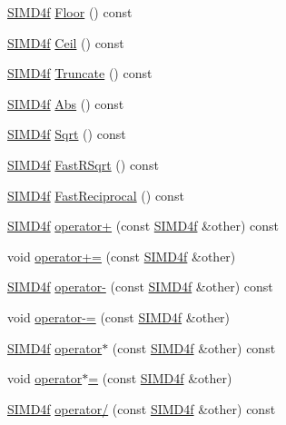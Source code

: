 \begin{DoxyCompactItemize}
\item 
\hyperlink{class_s_i_m_d4f}{S\+I\+M\+D4f} \hyperlink{class_s_i_m_d4f_a6687bf362a488251b8c5c495cfb2a385}{Floor} () const 
\item 
\hyperlink{class_s_i_m_d4f}{S\+I\+M\+D4f} \hyperlink{class_s_i_m_d4f_a8eec4c908f66003bb8bf1067a6c59bba}{Ceil} () const 
\item 
\hyperlink{class_s_i_m_d4f}{S\+I\+M\+D4f} \hyperlink{class_s_i_m_d4f_a80d9698aefb6ddcefde55b077ee22e2e}{Truncate} () const 
\item 
\hyperlink{class_s_i_m_d4f}{S\+I\+M\+D4f} \hyperlink{class_s_i_m_d4f_a57b0c4d2e3dee7a7463040c76f9d34bd}{Abs} () const 
\item 
\hyperlink{class_s_i_m_d4f}{S\+I\+M\+D4f} \hyperlink{class_s_i_m_d4f_a510350c7a4ed579fd9c143bd059e6e05}{Sqrt} () const 
\item 
\hyperlink{class_s_i_m_d4f}{S\+I\+M\+D4f} \hyperlink{class_s_i_m_d4f_a40f4dbbc2538ba8bd8d92c18e617ee59}{Fast\+R\+Sqrt} () const 
\item 
\hyperlink{class_s_i_m_d4f}{S\+I\+M\+D4f} \hyperlink{class_s_i_m_d4f_aee80a83cd05cbfe0062b4d6935d2d7b8}{Fast\+Reciprocal} () const 
\item 
\hyperlink{class_s_i_m_d4f}{S\+I\+M\+D4f} \hyperlink{class_s_i_m_d4f_a37059580a943f034510927272fa06c38}{operator+} (const \hyperlink{class_s_i_m_d4f}{S\+I\+M\+D4f} \&other) const 
\item 
void \hyperlink{class_s_i_m_d4f_ab547cee5fcc6f68c1e5e74c9e14cd564}{operator+=} (const \hyperlink{class_s_i_m_d4f}{S\+I\+M\+D4f} \&other)
\item 
\hyperlink{class_s_i_m_d4f}{S\+I\+M\+D4f} \hyperlink{class_s_i_m_d4f_a35950395f46f9e1e07e949ade9664876}{operator-\/} (const \hyperlink{class_s_i_m_d4f}{S\+I\+M\+D4f} \&other) const 
\item 
void \hyperlink{class_s_i_m_d4f_a6b83a005afad9d0cbafd6aa91387fbc5}{operator-\/=} (const \hyperlink{class_s_i_m_d4f}{S\+I\+M\+D4f} \&other)
\item 
\hyperlink{class_s_i_m_d4f}{S\+I\+M\+D4f} \hyperlink{class_s_i_m_d4f_a7c3566f2b6ec0dba55e889dcbadd48f0}{operator$\ast$} (const \hyperlink{class_s_i_m_d4f}{S\+I\+M\+D4f} \&other) const 
\item 
void \hyperlink{class_s_i_m_d4f_a6a74b6d3b0681777b34e3de2b47110c6}{operator$\ast$=} (const \hyperlink{class_s_i_m_d4f}{S\+I\+M\+D4f} \&other)
\item 
\hyperlink{class_s_i_m_d4f}{S\+I\+M\+D4f} \hyperlink{class_s_i_m_d4f_a8eb9f3ee0c70ef4569a875aead8b4985}{operator/} (const \hyperlink{class_s_i_m_d4f}{S\+I\+M\+D4f} \&other) const 

\end{DoxyCompactItemize}
